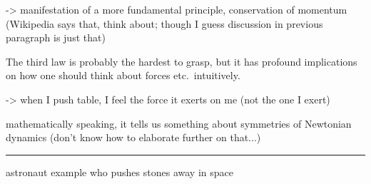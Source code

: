 \documentclass[../class_mech_main.tex]{subfiles}
\begin{document}
-> manifestation of a more fundamental principle, conservation of momentum (Wikipedia says that, think about; though I guess discussion in previous paragraph is just that)



The third law is probably the hardest to grasp, but it has profound implications on how one should think about forces etc.~intuitively.

-> when I push table, I feel the force it exerts on me (not the one I exert)


mathematically speaking, it tells us something about symmetries of Newtonian dynamics (don't know how to elaborate further on that...)


\hrule

\begin{ex}
	astronaut example who pushes stones away in space
\end{ex}
\end{document}
